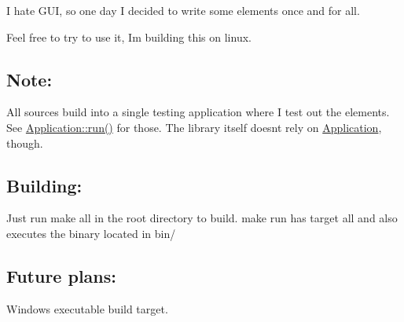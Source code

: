 I hate G\+UI, so one day I decided to write some elements once and for all.

Feel free to try to use it, I\textquotesingle{}m building this on linux.

\subsection*{Note\+:}

All sources build into a single testing application where I test out the elements. See {\ttfamily \mbox{\hyperlink{class_application_a8cf8941c8db90117d3735bce5ae1fdf4}{Application\+::run()}}} for those. The library itself doesn\textquotesingle{}t rely on {\ttfamily \mbox{\hyperlink{class_application}{Application}}}, though.

\subsection*{Building\+:}

Just run {\ttfamily make all} in the root directory to build. {\ttfamily make run} has target {\ttfamily all} and also executes the binary located in {\ttfamily bin/}

\subsection*{Future plans\+:}


\begin{DoxyItemize}
\item Windows executable build target. 
\end{DoxyItemize}